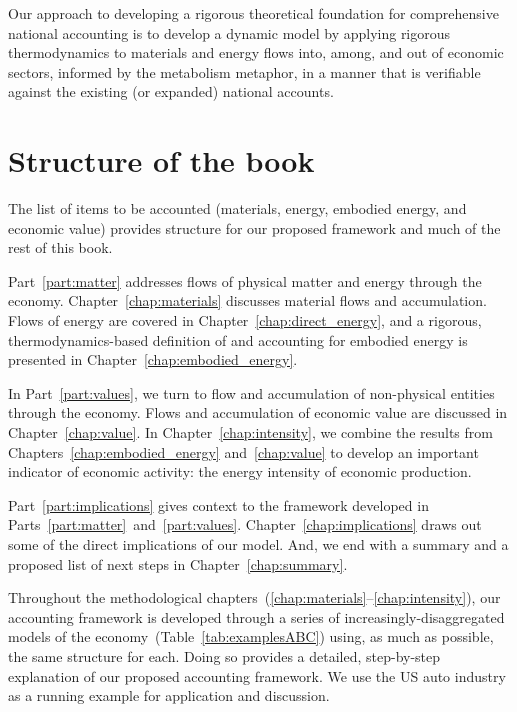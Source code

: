 Our approach to developing a rigorous theoretical foundation for 
comprehensive national accounting is to
develop a dynamic model 
by applying rigorous thermodynamics 
to materials and energy flows into, among, 
and out of economic sectors,
informed by the metabolism metaphor,
in a manner that is verifiable against 
the existing (or expanded) 
national accounts.


\section{Structure of the book}
\label{sec:structure}

The list of items to be accounted 
(materials, energy, embodied energy, and economic value)
provides structure for our proposed framework
and much of the rest of this book.

Part~\ref{part:matter} addresses flows of physical matter and energy
through the economy.
Chapter~\ref{chap:materials} discusses material flows and accumulation.
Flows of energy are covered in Chapter~\ref{chap:direct_energy}, 
and a rigorous, thermodynamics-based definition of and accounting for 
embodied energy is presented in Chapter~\ref{chap:embodied_energy}.

In Part~\ref{part:values}, we turn to flow and accumulation of 
non-physical entities through the economy. 
Flows and accumulation of economic value are discussed in Chapter~\ref{chap:value}.
In Chapter~\ref{chap:intensity}, we combine the results from 
Chapters~\ref{chap:embodied_energy} and~\ref{chap:value} to
develop an important indicator of economic activity:
the energy intensity of economic production.

Part~\ref{part:implications} gives context to the framework developed in
Parts~\ref{part:matter}~and~\ref{part:values}.
Chapter~\ref{chap:implications} draws out some of the direct implications
of our model.
And, we end with a summary and a proposed list of next steps in Chapter~\ref{chap:summary}.

Throughout the methodological chapters~(\ref{chap:materials}--\ref{chap:intensity}),
our accounting framework is developed
through a series of increasingly-disaggregated
models of the economy~(Table~\ref{tab:examplesABC})
using, as much as possible, the same structure for each.
Doing so provides a detailed, step-by-step explanation of our proposed accounting framework.
We use the US auto industry 
as a running example for application and discussion.

